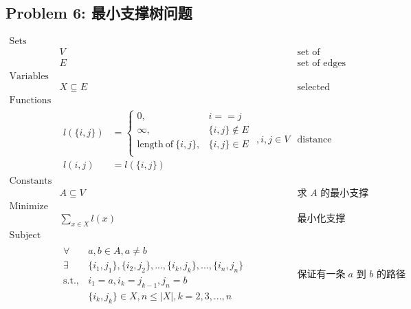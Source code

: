 \documentclass[11pt]{article}
\begin{document}
\newpage
\subsection*{Problem 6: 最小支撑树问题}

\begin{eqnarray*}
    \textrm{Sets} \\
        & V & \textrm{set of vertices} \\
        & E & \textrm{set of edges} \\
    \textrm{Variables} \\
        & X \subseteq E & \textrm{selected edges} \\
    \textrm{Functions} \\
        & \begin{array}{rl}
            l(\{i, j\}) &= \left\{
                \begin{array}{ll}
                    0,                              & i == j \\
                    \infty,                         & \{i, j\} \notin E \\
                    \mathrm{length\ of\ }\{i, j\},  & \{i, j\} \in E \\
                \end{array}
            \right. \\
            l(i, j) &= l(\{i, j\})
        \end{array}, i, j \in V & \textrm{distance between vertices} \\
    \textrm{Constants} \\
        & A \subseteq V & \textrm{求 $A$ 的最小支撑树} \\
    \textrm{Minimize} \\
        & \displaystyle \sum_{x \in X} l(x) & \textrm{最小化支撑树路径长度} \\
    \textrm{Subject to} \\
        & \begin{array}{rl}
            \forall & a, b \in A, a \neq b \\
            \exists & \{i_1, j_1\}, \{i_2, j_2\}, ..., \{i_k, j_k\}, ..., \{i_n, j_n\} \\
            \mathrm{s.t.,} & i_1 = a, i_k = j_{k-1}, j_n = b \\
                    & \{i_k, j_k\} \in X, n \leq |X|, k = 2, 3, ..., n
        \end{array} & \textrm{保证有一条 $a$ 到 $b$ 的路径} \\ 
\end{eqnarray*}
\end{document}
